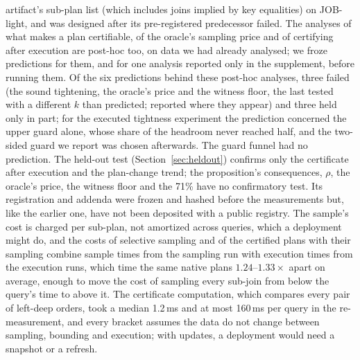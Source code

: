 \documentclass[sigconf, nonacm]{acmart}
\begin{document}
artifact's sub-plan list (which includes joins implied by key equalities) on
JOB-light, and was designed after its pre-registered predecessor failed. The analyses of
what makes a plan certifiable, of the oracle's sampling price and of certifying
after execution are post-hoc too, on data we had already analysed; we froze
predictions for them, and for one analysis reported only in the supplement,
before running them. Of the six predictions behind these post-hoc analyses, three
failed (the sound tightening, the oracle's price and the witness floor, the
last tested with a different $k$ than predicted; reported where they appear) and three held only in part; for the executed tightness
experiment the prediction concerned the upper guard alone, whose share of the
headroom never reached half, and the two-sided guard we report was chosen
afterwards. The guard funnel had no prediction. The held-out test
(Section~\ref{sec:heldout}) confirms only the certificate after execution and
the plan-change trend; the proposition's consequences, $\rho$, the oracle's
price, the witness floor and the 71\% have no confirmatory test. Its
registration and addenda were frozen and hashed before the measurements but,
like the earlier one, have not been deposited with a public registry. The sample's cost
is charged per sub-plan, not amortized across queries, which a deployment
might do, and the costs of selective sampling and of the certified plans with
their sampling combine sample times from the sampling run with execution times
from the execution runs, which time the same native plans $1.24$--$1.33\times$
apart on average, enough to move the cost of sampling every sub-join from below
the query's time to above it. The certificate computation, which compares every
pair of left-deep orders, took a median 1.2\,ms and at most 160\,ms per query
in the re-measurement, and every bracket assumes the data do
not change between sampling, bounding and execution; with updates, a deployment
would need a snapshot or a refresh.
\end{document}
